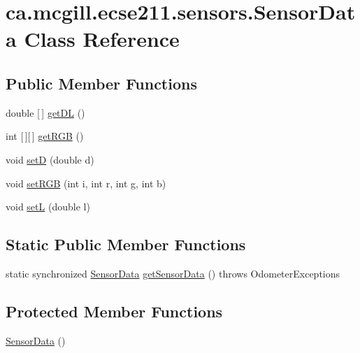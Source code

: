 \hypertarget{classca_1_1mcgill_1_1ecse211_1_1sensors_1_1_sensor_data}{}\section{ca.\+mcgill.\+ecse211.\+sensors.\+Sensor\+Data Class Reference}
\label{classca_1_1mcgill_1_1ecse211_1_1sensors_1_1_sensor_data}
\subsection*{Public Member Functions}
\begin{DoxyCompactItemize}
\item 
double \mbox{[}$\,$\mbox{]} \hyperlink{classca_1_1mcgill_1_1ecse211_1_1sensors_1_1_sensor_data_a4e0eabd547726c90bd0b7252557d7ad7}{get\+DL} ()
\item 
int \mbox{[}$\,$\mbox{]}\mbox{[}$\,$\mbox{]} \hyperlink{classca_1_1mcgill_1_1ecse211_1_1sensors_1_1_sensor_data_a0abd08431dae67c7ee0e7a18b5305f91}{get\+R\+GB} ()
\item 
void \hyperlink{classca_1_1mcgill_1_1ecse211_1_1sensors_1_1_sensor_data_ae20bf127c57dcfcb3b7632ca05b6d482}{setD} (double d)
\item 
void \hyperlink{classca_1_1mcgill_1_1ecse211_1_1sensors_1_1_sensor_data_ae5e2528566b53218673ebc1ae4683204}{set\+R\+GB} (int i, int r, int g, int b)
\item 
void \hyperlink{classca_1_1mcgill_1_1ecse211_1_1sensors_1_1_sensor_data_aeafd49ce71819e8e1a5d5ff6287e7819}{setL} (double l)
\end{DoxyCompactItemize}
\subsection*{Static Public Member Functions}
\begin{DoxyCompactItemize}
\item 
static synchronized \hyperlink{classca_1_1mcgill_1_1ecse211_1_1sensors_1_1_sensor_data}{Sensor\+Data} \hyperlink{classca_1_1mcgill_1_1ecse211_1_1sensors_1_1_sensor_data_ab8aef4bdb5d9f3dad399656e00af2539}{get\+Sensor\+Data} ()  throws Odometer\+Exceptions 
\end{DoxyCompactItemize}
\subsection*{Protected Member Functions}
\begin{DoxyCompactItemize}
\item 
\hyperlink{classca_1_1mcgill_1_1ecse211_1_1sensors_1_1_sensor_data_a41b9929f62455a15364385a339b4b910}{Sensor\+Data} ()
\end{DoxyCompactItemize}


